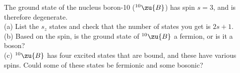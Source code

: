 The ground state of the nucleus boron-10 (${}^{10}\zu{B}$) has spin $s=3$, and
is therefore degenerate.\\
(a) List the $s_z$ states and check that the number of states you get
is $2s+1$.\\
(b) Based on the spin, is the ground state of ${}^{10}\zu{B}$ a fermion, or is it a boson?\\
(c) ${}^{10}\zu{B}$ has four excited states that are bound, and these
have various spins. Could some of these states be fermionic and some bosonic?
